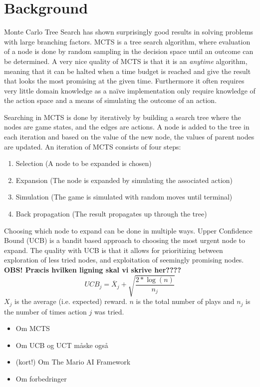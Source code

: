 \documentclass[10pt,a4paper]{article}
\begin{document}
\section{Background}
Monte Carlo Tree Search has shown surprisingly good results in solving problems with large branching factors. MCTS is a tree search algorithm, where evaluation of a node is done by random sampling in the decision space until an outcome can be determined. A very nice quality of MCTS is that it is an \emph{anytime} algorithm, meaning that it can be halted when a time budget is reached and give the result that looks the most promising at the given time. Furthermore it often requires very little domain knowledge as a naïve implementation only require knowledge of the action space and a means of simulating the outcome of an action.

Searching in MCTS is done by iteratively by building a search tree where the nodes are game states, and the edges are actions. A node is added to the tree in each iteration and based on the value of the new node, the values of parent nodes are updated.
An iteration of MCTS consists of four steps:
\begin{enumerate}
\item Selection (A node to be expanded is chosen)
\item Expansion (The node is expanded by simulating the associated action)
\item Simulation (The game is simulated with random moves until terminal)
\item Back propagation (The result propagates up through the tree)
\end{enumerate}

Choosing which node to expand can be done in multiple ways. Upper Confidence Bound (UCB) is a bandit based approach to choosing the most urgent node to expand. The quality with UCB is that it allows for prioritizing between exploration of less tried nodes, and exploitation of seemingly promising nodes.
\textbf{OBS! Præcis hvilken ligning skal vi skrive her????}
\begin{equation}
\label{eq:ucb1}
\displaystyle UCB_j = \overline{X}_j + \sqrt{\frac{2 * \log(n)}{n_j}}
\end{equation}
$X_j$ is the average (i.e. expected) reward. $n$ is the total number of plays and $n_j$ is the number of times action $j$ was tried.

\begin{itemize}
\item Om MCTS \cite{mctssurvey}
\item Om UCB og UCT \cite{mctssurvey} måske også \cite{mspacman}
\item (kort!) Om The Mario AI Framework  \cite{mario}
\item Om forbedringer
\end{itemize}
\clearpage
\end{document}
